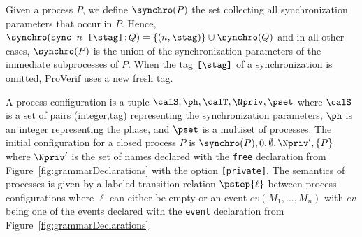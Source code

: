\documentclass{book}
\begin{document}
Given a process $P$, we define $\synchro(P)$ the set collecting all synchronization parameters that occur in $P$. Hence, $\synchro(\texttt{sync }n\texttt{ [}\stag\texttt{];}Q) = \{ (n, \stag) \} \cup \synchro(Q)$ and in all other cases, $\synchro(P)$ is the union of the synchronization parameters of the immediate subprocesses of $P$.
When the tag $\texttt{[}\stag\texttt{]}$ of a synchronization is omitted, ProVerif uses a
new fresh tag.

A process configuration is a tuple $\calS,\ph,\calT,\Npriv,\pset$ where $\calS$ is a set of pairs (integer,tag) representing the synchronization parameters, $\ph$ is an integer representing the phase,  and $\pset$ is a multiset of processes. The initial configuration for a closed process $P$ is $\synchro(P),0,\emptyset,\Npriv',\{ P \}$ where $\Npriv'$ is the set of names declared with the \texttt{free} declaration from Figure~\ref{fig:grammarDeclarations} with the option \texttt{[private]}. The semantics of processes is given by a labeled transition relation $\pstep{\ell}$ between process configurations where $\ell$ can either be empty or an event $ev(M_1,\ldots,M_n)$ with $ev$ being one of the events declared with the \texttt{event} declaration from Figure~\ref{fig:grammarDeclarations}.
\end{document}
